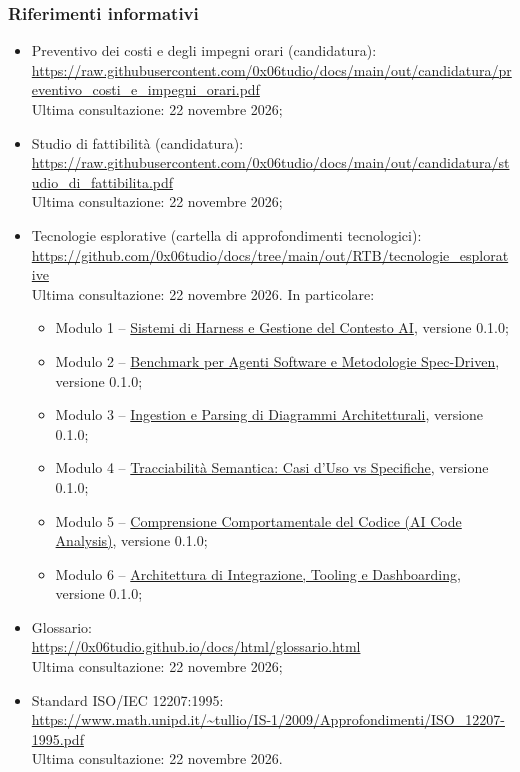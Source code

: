 \documentclass[a4paper, 11pt]{article}
\newcommand{\studio}[2]{\href{https://raw.githubusercontent.com/0x06tudio/docs/main/out/RTB/tecnologie_esplorative/#1}{#2}}
\begin{document}
\subsubsection{Riferimenti informativi}
\begin{itemize}[noitemsep]
    \item Preventivo dei costi e degli impegni orari (candidatura): \\
    \url{https://raw.githubusercontent.com/0x06tudio/docs/main/out/candidatura/preventivo_costi_e_impegni_orari.pdf} \\
    Ultima consultazione: 22 novembre 2026;
    \item Studio di fattibilità (candidatura): \\
    \url{https://raw.githubusercontent.com/0x06tudio/docs/main/out/candidatura/studio_di_fattibilita.pdf} \\
    Ultima consultazione: 22 novembre 2026;
    \item Tecnologie esplorative (cartella di approfondimenti tecnologici): \\
    \url{https://github.com/0x06tudio/docs/tree/main/out/RTB/tecnologie_esplorative} \\
    Ultima consultazione: 22 novembre 2026. In particolare:
    \begin{itemize}[noitemsep]
        \item Modulo 1 -- \studio{studio_tecnologico_harness_e_opencode.pdf}{Sistemi di Harness e Gestione del Contesto AI}, versione 0.1.0;
        \item Modulo 2 -- \studio{Benchmark_SpecCheck.pdf}{Benchmark per Agenti Software e Metodologie Spec-Driven}, versione 0.1.0;
        \item Modulo 3 -- \studio{ingestion_parsing.pdf}{Ingestion e Parsing di Diagrammi Architetturali}, versione 0.1.0;
        \item Modulo 4 -- \studio{tracciabilita_semantica.pdf}{Tracciabilità Semantica: Casi d'Uso vs Specifiche}, versione 0.1.0;
        \item Modulo 5 -- \studio{Studio_Tecnologico_Modulo5_AI_Code_Analysis.pdf}{Comprensione Comportamentale del Codice (AI Code Analysis)}, versione 0.1.0;
        \item Modulo 6 -- \studio{architettura_integrazione_tooling_dashboarding.pdf}{Architettura di Integrazione, Tooling e Dashboarding}, versione 0.1.0;
    \end{itemize}
    \item Glossario: \\
    \url{https://0x06tudio.github.io/docs/html/glossario.html} \\
    Ultima consultazione: 22 novembre 2026;
    \item Standard ISO/IEC 12207:1995: \\
    \url{https://www.math.unipd.it/~tullio/IS-1/2009/Approfondimenti/ISO_12207-1995.pdf} \\
    Ultima consultazione: 22 novembre 2026.
\end{itemize}
\end{document}
